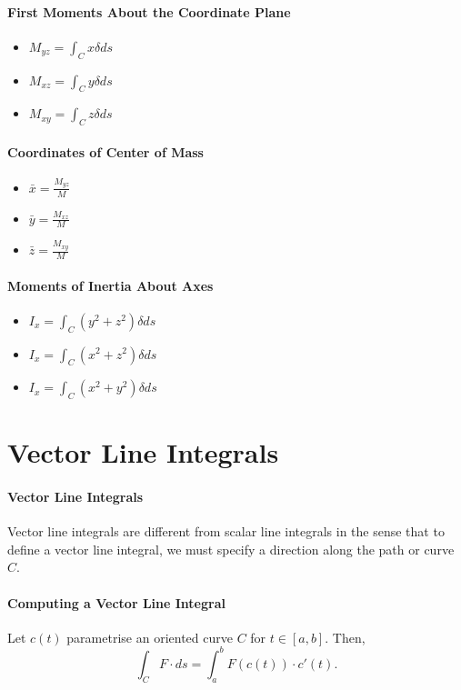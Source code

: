 \documentclass[12pt, letterpaper]{article}
\begin{document}
    \paragraph{First Moments About the Coordinate Plane}
    \begin{itemize}
        \item \(M_{yz} = \int_C x \delta ds\)
        \item \(M_{xz} = \int_C y \delta ds\)
        \item \(M_{xy} = \int_C z \delta ds\)
    \end{itemize}
    
    \paragraph{Coordinates of Center of Mass}  
    \begin{itemize}
        \item \(\bar{x} = \frac{M_{yz}}{M}\)
        \item \(\bar{y} = \frac{M_{xz}}{M}\)
        \item \(\bar{z} = \frac{M_{xy}}{M}\)
    \end{itemize}
    
    \paragraph{Moments of Inertia About Axes}
    \begin{itemize}
        \item \(I_x = \int_C (y^2 + z^2) \delta ds\)
        \item \(I_x = \int_C (x^2 + z^2) \delta ds\)
        \item \(I_x = \int_C (x^2 + y^2) \delta ds\)
    \end{itemize}
    
    
    \section{Vector Line Integrals}
    \paragraph{Vector Line Integrals}  
    Vector line integrals are different from scalar line integrals in the
    sense that to define a vector line integral, we must specify a direction
    along the path or curve \(C\).

    \paragraph{Computing a Vector Line Integral}
    Let \(c(t)\) parametrise an oriented curve \(C\) for \(t\in [a, b]\).
    Then, 
    \[
        \int_C F\cdot ds = \int_a^b F(c(t)) \cdot c'(t).
    \]
    
\end{document}

